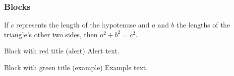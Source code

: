 \documentclass[aspectratio=169]{beamer}
\begin{document}
\begin{frame}
\frametitle{Blocks}
	\begin{theorem}[Pythagoras]
		If $c$ represents the length of the hypotenuse and $a$ and $b$ the lengths of the triangle's other two sides, then $a^2+b^2=c^2$.
	\end{theorem}

	\begin{alertblock}{Block with red title (alert)}
		Alert text.
	\end{alertblock}

	\begin{exampleblock}{Block with green title (example)}
		Example text.
	\end{exampleblock}
\end{frame}
\end{document}
